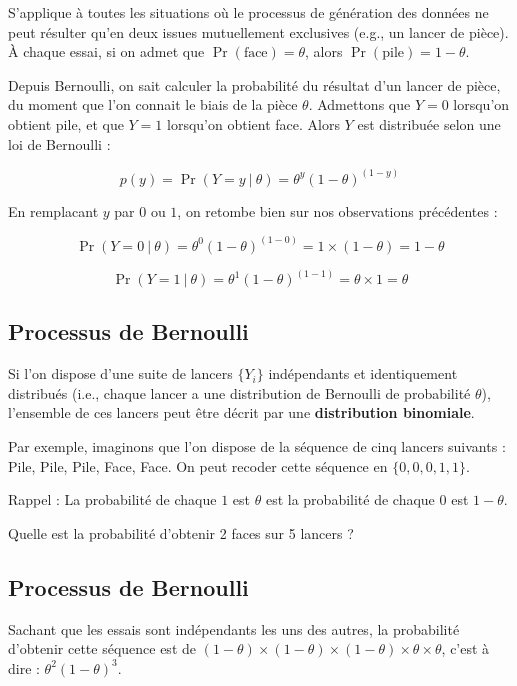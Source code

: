\documentclass[
  a4paper,11pt,twoside,onecolumn,openright,final,oldfontcommands]{memoir}
\theoremstyle{definition}
\theoremstyle{definition}
\theoremstyle{definition}
\theoremstyle{remark}
\begin{document}
S'applique à toutes les situations où le processus de génération des données ne peut résulter qu'en deux issues mutuellement exclusives (e.g., un lancer de pièce). À chaque essai, si on admet que \(\Pr(\text{face}) = \theta\), alors \(\Pr(\text{pile}) = 1 - \theta\).

Depuis Bernoulli, on sait calculer la probabilité du résultat d'un lancer de pièce, du moment que l'on connait le biais de la pièce \(\theta\). Admettons que \(Y = 0\) lorsqu'on obtient pile, et que \(Y = 1\) lorsqu'on obtient face. Alors \(Y\) est distribuée selon une loi de Bernoulli :

\[p(y) = \Pr(Y = y \ | \ \theta) = \theta^{y} (1 - \theta)^{(1 - y)}\]

En remplacant \(y\) par \(0\) ou \(1\), on retombe bien sur nos observations précédentes :

\[\Pr(Y = 0 \ | \ \theta) = \theta^{0} (1 - \theta)^{(1 - 0)} = 1 \times (1 - \theta) = 1 - \theta\]

\[\Pr(Y = 1 \ | \ \theta) = \theta^{1} (1 - \theta)^{(1 - 1)} = \theta \times 1 = \theta\]

\hypertarget{processus-de-bernoulli}{%
\subsection{Processus de Bernoulli}\label{processus-de-bernoulli}}

Si l'on dispose d'une suite de lancers \(\{Y_i\}\) indépendants et identiquement distribués (i.e., chaque lancer a une distribution de Bernoulli de probabilité \(\theta\)), l'ensemble de ces lancers peut être décrit par une \textbf{distribution binomiale}.

Par exemple, imaginons que l'on dispose de la séquence de cinq lancers suivants : Pile, Pile, Pile, Face, Face. On peut recoder cette séquence en \(\{0, 0, 0, 1, 1\}\).

Rappel : La probabilité de chaque \(1\) est \(\theta\) est la probabilité de chaque \(0\) est \(1 - \theta\).

Quelle est la probabilité d'obtenir 2 faces sur 5 lancers ?

\hypertarget{processus-de-bernoulli-1}{%
\subsection{Processus de Bernoulli}\label{processus-de-bernoulli-1}}

Sachant que les essais sont indépendants les uns des autres, la probabilité d'obtenir cette séquence est de \((1 - \theta) \times (1 - \theta) \times (1 - \theta) \times \theta \times \theta\), c'est à dire : \(\theta^{2} (1 - \theta)^{3}\).
\end{document}
